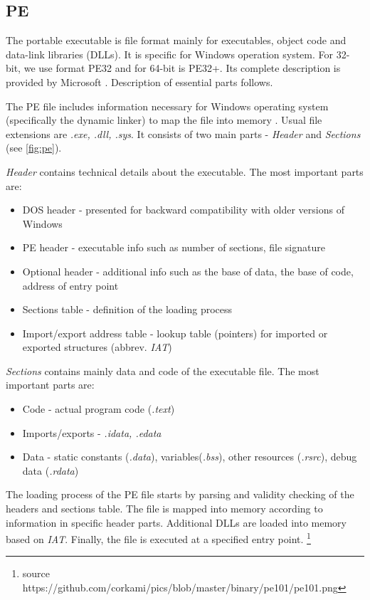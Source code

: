 \subsection{PE}
The portable executable is file format mainly for executables, object code and data-link libraries (DLLs). It is specific for Windows operation system. For 32-bit, we use format PE32 and for 64-bit is PE32+. Its complete description is provided by Microsoft \cite{PEFormat89:online}. Description of essential parts follows.

The PE file includes information necessary for Windows operating system (specifically the dynamic linker) to map the file into memory \cite{Gibert2020}. Usual file extensions are \emph{.exe, .dll, .sys}. It consists of two main parts - \emph{Header} and \emph{Sections} (see \ref{fig:pe}). 

\emph{Header} contains technical details about the executable. The most important parts are:
\begin{itemize}
  \itemsep0em 
  \item DOS header - presented for backward compatibility with older versions of Windows
  \item PE header - executable info such as number of sections, file signature
  \item Optional header - additional info such as the base of data, the base of code, address of entry point
  \item Sections table - definition of the loading process
  \item Import/export address table - lookup table (pointers) for imported or exported structures (abbrev. \emph{IAT})
\end{itemize}

\emph{Sections} contains mainly data and code of the executable file. The most important parts are:
\begin{itemize}
  \itemsep0em 
  \item Code - actual program code (\emph{.text})
  \item Imports/exports - \emph{.idata, .edata}
  \item Data - static constants (\emph{.data}), variables(\emph{.bss}), other resources (\emph{.rsrc}), debug data (\emph{.rdata})
\end{itemize}

The loading process of the PE file starts by parsing and validity checking of the headers and sections table. The file is mapped into memory according to information in specific header parts. Additional DLLs are loaded into memory based on \emph{IAT}. Finally, the file is executed at a specified entry point. \footnote{source https://github.com/corkami/pics/blob/master/binary/pe101/pe101.png}

